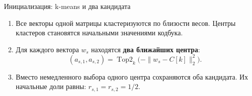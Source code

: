 \documentclass[aspectratio=169,10pt]{beamer}
\newcommand{\takeaway}[1]{\par\vspace{1.5mm}{\bfseries #1\par}}
\newcommand{\tights}{\setlength{\itemsep}{1.4mm}\setlength{\parsep}{0pt}\setlength{\parskip}{0pt}}
\begin{document}
\begin{frame}[t]{Инициализация: k-means и два кандидата}
  \begin{enumerate}\tights
    \item Все векторы одной матрицы кластеризуются по близости весов.
    Центры кластеров становятся начальными значениями кодбука.
    \item Для каждого вектора $w_s$ находятся \textbf{два ближайших центра}:
    \[
      (a_{s,1},a_{s,2})=\operatorname{Top2}_{k}\bigl(-\|w_s-C[k]\|_2^2\bigr).
    \]
    \item Вместо немедленного выбора одного центра сохраняются оба кандидата.
    Их начальные доли равны: $r_{s,1}=r_{s,2}=1/2$.
  \end{enumerate}
  \begin{center}
  \end{center}
  \takeaway{Кандидаты выбираются по весам;\par окончательное назначение определяется по работе блока.}
\end{frame}
\end{document}
